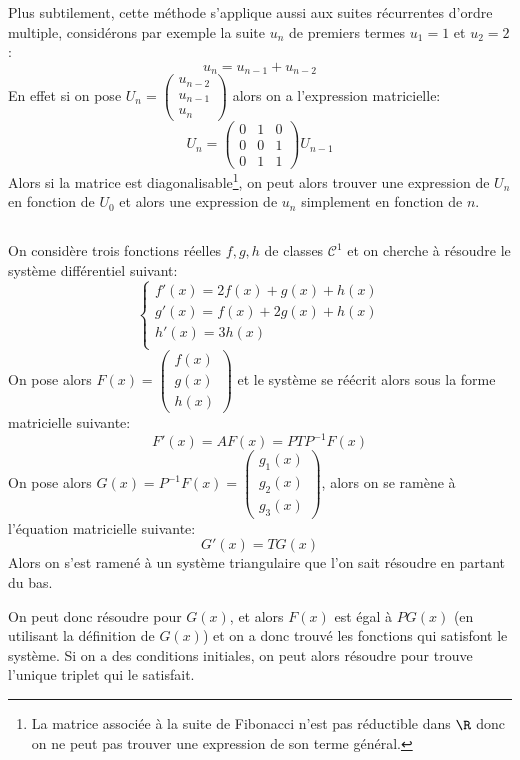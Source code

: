Plus subtilement, cette méthode s'applique aussi aux suites récurrentes d'ordre multiple, considérons par exemple la suite \(u_n\) de premiers termes \(u_1 = 1\) et \(u_2 = 2\) :
\[
   u_{n} = u_{n - 1} + u_{n - 2}   
\]
En effet si on pose \(U_n = \begin{pmatrix}
   u_{n-2} \\ u_{n-1} \\ u_n
\end{pmatrix}\)
alors on a l'expression matricielle:
\[
   U_{n} = \begin{pmatrix}0 & 1 & 0 \\ 0 & 0 & 1 \\ 0 & 1 & 1\end{pmatrix}U_{n - 1}  
\]
Alors si la matrice est diagonalisable\footnote[1]{La matrice associée à la suite de Fibonacci n'est pas réductible dans \(\R\) donc on ne peut pas trouver une expression de son terme général.}, on peut alors trouver une expression de \(U_n\) en fonction de \(U_0\) et alors une expression de \(u_n\) simplement en fonction de \(n\).
\subsection*{}
On considère trois fonctions réelles \(f, g, h\) de classes \(\mathcal{C}^1\) et on cherche à résoudre le système différentiel suivant:
\[
   \begin{cases}
      f'(x) = 2f(x) + g(x) + h(x)\\
      g'(x) = f(x) + 2g(x) + h(x)\\
      h'(x) = 3h(x)\\
   \end{cases}  
\]
On pose alors \(F(x) = \begin{pmatrix}
   f(x) \\ g(x) \\ h(x)
\end{pmatrix}\) et le système se réécrit alors sous la forme matricielle suivante:
\[
   F'(x) = AF(x) = PTP^{-1}F(x)
\]
On pose alors \(G(x) = P^{-1}F(x) = \begin{pmatrix} g_1(x) \\ g_2(x) \\ g_3(x) \end{pmatrix}\), alors on se ramène à l'équation matricielle suivante:
\[
   G'(x) = TG(x)    
\]
Alors on s'est ramené à un système triangulaire que l'on sait résoudre en partant du bas.\<

On peut donc résoudre pour \(G(x)\), et alors \(F(x)\) est égal à \(PG(x)\) (en utilisant la définition de \(G(x)\)) et on a donc trouvé les fonctions qui satisfont le système. Si on a des conditions initiales, on peut alors résoudre pour trouve l'unique triplet qui le satisfait.
